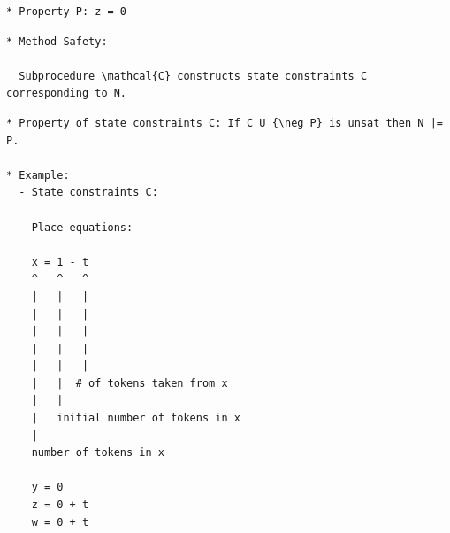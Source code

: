 \documentclass{article}
\begin{document}
\begin{verbatim}
* Property P: z = 0
\end{verbatim}

\newpage
\begin{verbatim}
* Method Safety:

  Subprocedure \mathcal{C} constructs state constraints C corresponding to N.
\end{verbatim}

\begin{center}
\end{center}

\begin{verbatim}
* Property of state constraints C: If C U {\neg P} is unsat then N |= P.

* Example:
  - State constraints C:

    Place equations:
  
    x = 1 - t
    ^   ^   ^
    |   |   |
    |   |   |
    |   |   |
    |   |   |
    |   |   |
    |   |  # of tokens taken from x
    |   |
    |   initial number of tokens in x
    |
    number of tokens in x

    y = 0
    z = 0 + t
    w = 0 + t
\end{verbatim}

\newpage
\end{document}
